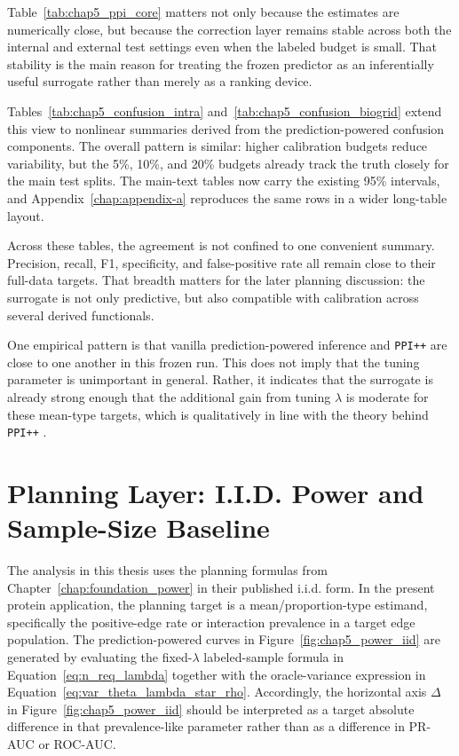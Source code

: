 
Table~\ref{tab:chap5_ppi_core} matters not only because the estimates are numerically close, but because the correction layer remains stable across both the internal and external test settings even when the labeled budget is small. That stability is the main reason for treating the frozen predictor as an inferentially useful surrogate rather than merely as a ranking device.

Tables~\ref{tab:chap5_confusion_intra} and~\ref{tab:chap5_confusion_biogrid} extend this view to nonlinear summaries derived from the prediction-powered confusion components. The overall pattern is similar: higher calibration budgets reduce variability, but the 5\%, 10\%, and 20\% budgets already track the truth closely for the main test splits. The main-text tables now carry the existing 95\% intervals, and Appendix~\ref{chap:appendix-a} reproduces the same rows in a wider long-table layout.



Across these tables, the agreement is not confined to one convenient summary. Precision, recall, F1, specificity, and false-positive rate all remain close to their full-data targets. That breadth matters for the later planning discussion: the surrogate is not only predictive, but also compatible with calibration across several derived functionals.

One empirical pattern is that vanilla prediction-powered inference and \texttt{PPI++} are close to one another in this frozen run. This does not imply that the tuning parameter is unimportant in general. Rather, it indicates that the surrogate is already strong enough that the additional gain from tuning $\lambda$ is moderate for these mean-type targets, which is qualitatively in line with the theory behind \texttt{PPI++} \parencite{ppi_pp, ppi_power}.

\section[I.I.D. Planning Baseline]{Planning Layer: I.I.D. Power and Sample-Size Baseline}

The analysis in this thesis uses the planning formulas from Chapter~\ref{chap:foundation_power} in their published i.i.d. form. In the present protein application, the planning target is a mean/proportion-type estimand, specifically the positive-edge rate or interaction prevalence in a target edge population. The prediction-powered curves in Figure~\ref{fig:chap5_power_iid} are generated by evaluating the fixed-\(\lambda\) labeled-sample formula in Equation~\eqref{eq:n_req_lambda} together with the oracle-variance expression in Equation~\eqref{eq:var_theta_lambda_star_rho}. Accordingly, the horizontal axis $\Delta$ in Figure~\ref{fig:chap5_power_iid} should be interpreted as a target absolute difference in that prevalence-like parameter rather than as a difference in PR-AUC or ROC-AUC.

